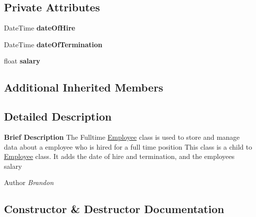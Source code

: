 \subsection*{Private Attributes}
\begin{DoxyCompactItemize}
\item 
\hypertarget{class_all_employees_1_1_fulltime_employee_aa072bd7c652567684c77e0cfd6638af2}{}Date\+Time {\bfseries date\+Of\+Hire}\label{class_all_employees_1_1_fulltime_employee_aa072bd7c652567684c77e0cfd6638af2}

\item 
\hypertarget{class_all_employees_1_1_fulltime_employee_a3836c1a3f74f71f87652c91913eb570c}{}Date\+Time {\bfseries date\+Of\+Termination}\label{class_all_employees_1_1_fulltime_employee_a3836c1a3f74f71f87652c91913eb570c}

\item 
\hypertarget{class_all_employees_1_1_fulltime_employee_afd766110662d0321998cecb84d0dd425}{}float {\bfseries salary}\label{class_all_employees_1_1_fulltime_employee_afd766110662d0321998cecb84d0dd425}

\end{DoxyCompactItemize}
\subsection*{Additional Inherited Members}


\subsection{Detailed Description}
{\bfseries Brief Description} The Fulltime \hyperlink{class_all_employees_1_1_employee}{Employee} class is used to store and manage data about a employee who is hired for a full time position This class is a child to \hyperlink{class_all_employees_1_1_employee}{Employee} class. It adds the date of hire and termination, and the employees salary 

\begin{DoxyAuthor}{Author}
{\itshape Brandon} 
\end{DoxyAuthor}


\subsection{Constructor \& Destructor Documentation}
\hypertarget{class_all_employees_1_1_fulltime_employee_a2f7744fed20aa3161c5ac5cd37c1a281}{}
